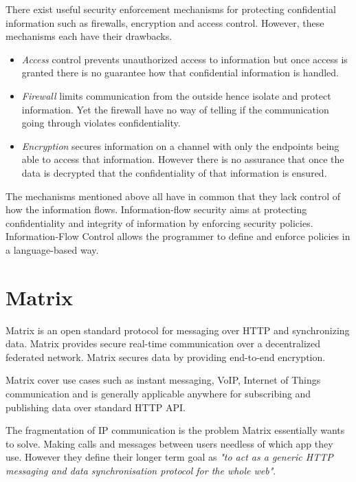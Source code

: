 There exist useful security enforcement mechanisms for protecting confidential information such as firewalls, encryption and access control. However, these mechanisms each have their drawbacks.

\begin{itemize}
	\item \emph{Access} control prevents unauthorized access to information but once access is granted there is no guarantee how that confidential information is handled.
	\item \emph{Firewall} limits communication from the outside hence isolate and protect information. Yet the firewall have no way of telling if the communication going through violates confidentiality.
	\item \emph{Encryption} secures information on a channel with only the endpoints being able to access that information. However there is no assurance that once the data is decrypted that the confidentiality of that information is ensured.
\end{itemize}

The mechanisms mentioned above all have in common that they lack control of how the information flows. Information-flow security aims at protecting confidentiality and integrity of information by enforcing security policies. Information-Flow Control allows the programmer to define and enforce policies in a language-based way. 



\section{Matrix}\label{matrix:intro}
Matrix is an open standard protocol for messaging over HTTP and synchronizing data. Matrix provides secure real-time communication over a decentralized federated network. Matrix secures data by providing end-to-end encryption.

Matrix cover use cases such as instant messaging, VoIP, Internet of Things communication and is generally applicable anywhere for subscribing and publishing data over standard HTTP API.
 
The fragmentation of IP communication is the problem Matrix essentially wants to solve. Making calls and messages between users needless of which app they use. However they define their longer term goal as \emph{"to act as a generic HTTP messaging and data synchronisation protocol for the whole web"}.



